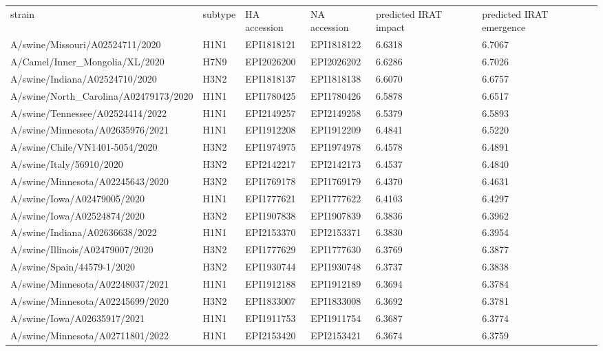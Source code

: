 \begin{tabular}{L{1.95in}|L{.25in}|L{.60in}|L{.6in}|C{1in}|C{1in}}\hline
strain&subtype& HA  accession & NA  accession & predicted  IRAT  impact & predicted  IRAT  emergence \\
 A/swine/Missouri/A02524711/2020 &H1N1&EPI1818121&EPI1818122&6.6318&6.7067\\
 A/Camel/Inner\_Mongolia/XL/2020 &H7N9&EPI2026200&EPI2026202&6.6286&6.7026\\
 A/swine/Indiana/A02524710/2020 &H3N2&EPI1818137&EPI1818138&6.6070&6.6757\\
 A/swine/North\_Carolina/A02479173/2020 &H1N1&EPI1780425&EPI1780426&6.5878&6.6517\\
 A/swine/Tennessee/A02524414/2022 &H1N1&EPI2149257&EPI2149258&6.5379&6.5893\\
 A/swine/Minnesota/A02635976/2021 &H1N1&EPI1912208&EPI1912209&6.4841&6.5220\\
 A/swine/Chile/VN1401-5054/2020 &H3N2&EPI1974975&EPI1974978&6.4578&6.4891\\
 A/swine/Italy/56910/2020 &H3N2&EPI2142217&EPI2142173&6.4537&6.4840\\
 A/swine/Minnesota/A02245643/2020 &H3N2&EPI1769178&EPI1769179&6.4370&6.4631\\
 A/swine/Iowa/A02479005/2020 &H1N1&EPI1777621&EPI1777622&6.4103&6.4297\\
 A/swine/Iowa/A02524874/2020 &H3N2&EPI1907838&EPI1907839&6.3836&6.3962\\
 A/swine/Indiana/A02636638/2022 &H1N1&EPI2153370&EPI2153371&6.3830&6.3954\\
 A/swine/Illinois/A02479007/2020 &H3N2&EPI1777629&EPI1777630&6.3769&6.3877\\
 A/swine/Spain/44579-1/2020 &H3N2&EPI1930744&EPI1930748&6.3737&6.3838\\
 A/swine/Minnesota/A02248037/2021 &H1N1&EPI1912188&EPI1912189&6.3694&6.3784\\
 A/swine/Minnesota/A02245699/2020 &H3N2&EPI1833007&EPI1833008&6.3692&6.3781\\
 A/swine/Iowa/A02635917/2021 &H1N1&EPI1911753&EPI1911754&6.3687&6.3774\\
 A/swine/Minnesota/A02711801/2022 &H1N1&EPI2153420&EPI2153421&6.3674&6.3759\\

\end{tabular}
